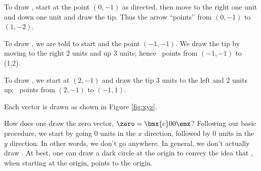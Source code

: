{To draw \vx, start at the point $(0,-1)$ as directed, then move to the right one unit and down one unit and draw the tip. Thus the arrow ``points'' from $(0,-1)$ to $(1,-2)$.

To draw \vy, we are told to start and the point $(-1,-1)$. We draw the tip by moving to the right 2 units and up 3 units; hence \vy\ points from $(-1,-1)$ to (1,2).

To draw \vz, we start at $(2,-1)$ and draw the tip 3 units to the left and 2 units up; \vz\ points from $(2,-1)$ to $(-1,1)$.

Each vector is drawn as shown in Figure \ref{fig:xyz}.

\begin{myfigure}%
\begin{center}
\end{center}
\label{fig:xyz}
\end{myfigure}
{}\baselineskip}

\medskip

How does one draw the zero vector, $\zero =\bmx{c}0\\0\emx$? Following our basic procedure, we start by going 0 units in the $x$ direction, followed by 0 units in the $y$ direction. In other words, we don't go anywhere. 
In general, we don't actually draw \zero. At best, one can draw a dark circle at the origin to convey the idea that \zero, when starting at the origin, points to the origin.



